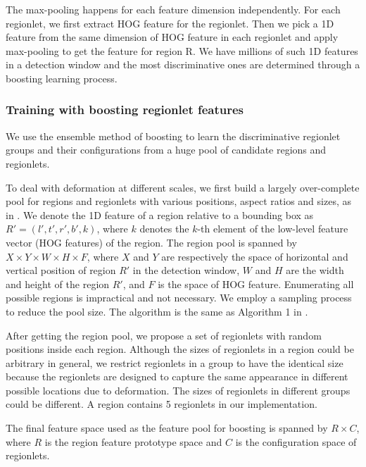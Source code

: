 \documentclass{article} %
\begin{document}
The max-pooling happens for each feature dimension independently. For each regionlet, we first extract HOG feature for the regionlet. Then we pick a 1D feature from the same dimension of HOG feature in each regionlet and apply max-pooling to get the feature for region R. We have millions of such 1D features in a detection window and the most discriminative ones are determined through a boosting learning process.

\subsubsection{Training with boosting regionlet features}
\label{training_regionlets}

We use the ensemble method of boosting to learn the discriminative regionlet groups and their configurations from a huge pool of candidate regions and regionlets.

To deal with deformation at different scales, we first build a largely over-complete pool for regions and regionlets with various positions, aspect ratios and sizes, as in \cite{Wang2013}. 
We denote the 1D feature of a region relative to a bounding box as $R'= (l', t', r', b', k)$, where $k$ denotes the $k$-th element of the low-level feature vector (HOG features) of the region. The region pool is spanned by $X \times Y \times W \times H \times F$, where $X$ and $Y$ are respectively the space of horizontal and vertical position of region $R'$ in the detection window, $W$ and $H$ are the width and height of the region $R'$, and $F$ is the space of HOG feature. Enumerating all possible regions is impractical and not necessary. We employ a sampling process to reduce the pool size. The algorithm is the same as Algorithm 1 in \cite{Wang2013}.

After getting the region pool, we propose a set of regionlets with random positions inside each region. Although the sizes of regionlets in a region could be arbitrary in general, we restrict regionlets in a group to have the identical size because the regionlets are designed to capture the same appearance in different possible locations due to deformation\cite{Wang2013}. The sizes of regionlets in different groups could be different. A region contains 5 regionlets in our implementation.

The final feature space used as the feature pool for boosting is spanned by $R \times C$, where $R$ is the region feature prototype space and $C$ is the configuration space of regionlets.
\end{document}
